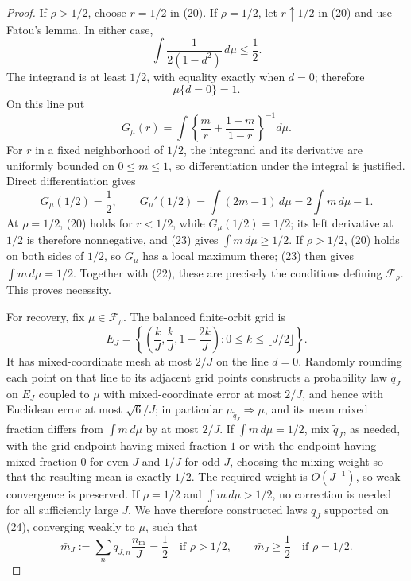 \documentclass{article}
\begin{document}
\begin{proof}
If \(\rho>1/2\), choose \(r=1/2\) in (20).  If \(\rho=1/2\), let \(r\uparrow1/2\) in (20) and use Fatou's lemma.  In either case,
\[
 \int\frac1{2(1-d^2)}\,d\mu\le\frac12.
 \tag{21}
\]
The integrand is at least \(1/2\), with equality exactly when \(d=0\); therefore
\[
 \mu\{d=0\}=1.
 \tag{22}
\]
On this line put
\[
 G_\mu(r)=\int
 \left\{\frac m r+\frac{1-m}{1-r}\right\}^{-1}d\mu.
\]
For \(r\) in a fixed neighborhood of \(1/2\), the integrand and its derivative are uniformly bounded on \(0\le m\le1\), so differentiation under the integral is justified.  Direct differentiation gives
\[
 G_\mu(1/2)=\frac12,
 \qquad
 G_\mu'(1/2)=\int(2m-1)\,d\mu
 =2\int m\,d\mu-1.
 \tag{23}
\]
At \(\rho=1/2\), (20) holds for \(r<1/2\), while \(G_\mu(1/2)=1/2\); its left derivative at \(1/2\) is therefore nonnegative, and (23) gives \(\int m\,d\mu\ge1/2\).  If \(\rho>1/2\), (20) holds on both sides of \(1/2\), so \(G_\mu\) has a local maximum there; (23) then gives \(\int m\,d\mu=1/2\).  Together with (22), these are precisely the conditions defining \(\mathcal F_\rho\).  This proves necessity.

For recovery, fix \(\mu\in\mathcal F_\rho\).  The balanced finite-orbit grid is
\[
 E_J=\left\{
 \left(\frac kJ,\frac kJ,1-\frac{2k}J\right):
 0\le k\le\lfloor J/2\rfloor
 \right\}.
 \tag{24}
\]
It has mixed-coordinate mesh at most \(2/J\) on the line \(d=0\).  Randomly rounding each point on that line to its adjacent grid points constructs a probability law \(\widetilde q_J\) on \(E_J\) coupled to \(\mu\) with mixed-coordinate error at most \(2/J\), and hence with Euclidean error at most \(\sqrt6/J\); in particular \(\mu_{\widetilde q_J}\Rightarrow\mu\), and its mean mixed fraction differs from \(\int m\,d\mu\) by at most \(2/J\).  If \(\int m\,d\mu=1/2\), mix \(\widetilde q_J\), as needed, with the grid endpoint having mixed fraction \(1\) or with the endpoint having mixed fraction \(0\) for even \(J\) and \(1/J\) for odd \(J\), choosing the mixing weight so that the resulting mean is exactly \(1/2\).  The required weight is \(O(J^{-1})\), so weak convergence is preserved.  If \(\rho=1/2\) and \(\int m\,d\mu>1/2\), no correction is needed for all sufficiently large \(J\).  We have therefore constructed laws \(q_J\) supported on (24), converging weakly to \(\mu\), such that
\[
 \bar m_J:=\sum_nq_{J,n}\frac{n_{\mathrm m}}J
 =\frac12\quad\text{if }\rho>1/2,
 \qquad
 \bar m_J\ge\frac12\quad\text{if }\rho=1/2.
 \tag{25}
\]


\end{proof}
\end{document}
